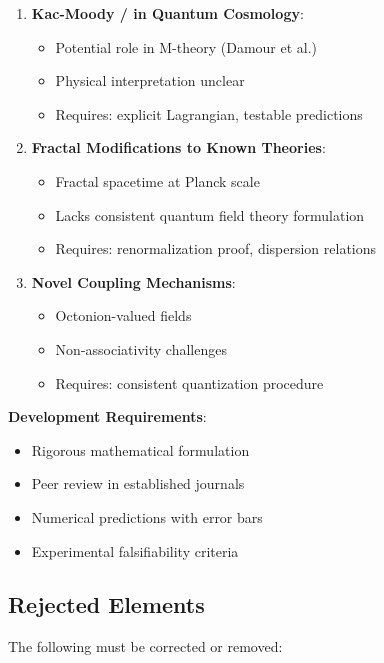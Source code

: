 \begin{enumerate}
    \item \textbf{Kac-Moody / in Quantum Cosmology}:
    \begin{itemize}
        \item[$\sim$] Potential role in M-theory (Damour et al.)
        \item[$-$] Physical interpretation unclear
        \item[$-$] Requires: explicit Lagrangian, testable predictions
    \end{itemize}

    \item \textbf{Fractal Modifications to Known Theories}:
    \begin{itemize}
        \item[$\sim$] Fractal spacetime at Planck scale
        \item[$-$] Lacks consistent quantum field theory formulation
        \item[$-$] Requires: renormalization proof, dispersion relations
    \end{itemize}

    \item \textbf{Novel Coupling Mechanisms}:
    \begin{itemize}
        \item[$\sim$] Octonion-valued fields
        \item[$-$] Non-associativity challenges
        \item[$-$] Requires: consistent quantization procedure
    \end{itemize}
\end{enumerate}

\textbf{Development Requirements}:
\begin{itemize}
    \item Rigorous mathematical formulation
    \item Peer review in established journals
    \item Numerical predictions with error bars
    \item Experimental falsifiability criteria
\end{itemize}

\subsection{Rejected Elements}

The following must be corrected or removed:

